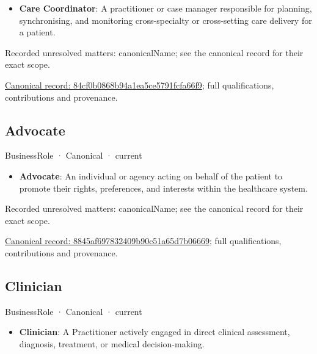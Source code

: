 \begin{itemize}


\item \textbf{Care Coordinator}: A practitioner or case manager responsible for planning, synchronising, and monitoring cross-specialty or cross-setting care delivery for a patient.

\end{itemize}

{\small Recorded unresolved matters: canonicalName; see the canonical record for their exact scope.}\par
{\footnotesize \href{../../../../continuum/business/business-role/84cf0b0868b94a1ea5ce5791fcfa66f9.md}{Canonical record: 84cf0b0868b94a1ea5ce5791fcfa66f9}; full qualifications, contributions and provenance.}\par
\subsection{Advocate}

\label{element:8845af697832409b90c51a65d7b06669}
{\small BusinessRole · Canonical · current}\par

\begin{itemize}


\item \textbf{Advocate}: An individual or agency acting on behalf of the patient to promote their rights, preferences, and interests within the healthcare system.

\end{itemize}

{\small Recorded unresolved matters: canonicalName; see the canonical record for their exact scope.}\par
{\footnotesize \href{../../../../continuum/business/business-role/8845af697832409b90c51a65d7b06669.md}{Canonical record: 8845af697832409b90c51a65d7b06669}; full qualifications, contributions and provenance.}\par
\subsection{Clinician}

\label{element:94fbd35dadc543dd8c5efaca1951e005}
{\small BusinessRole · Canonical · current}\par

\begin{itemize}


\item \textbf{Clinician}: A Practitioner actively engaged in direct clinical assessment, diagnosis, treatment, or medical decision-making.

\end{itemize}

